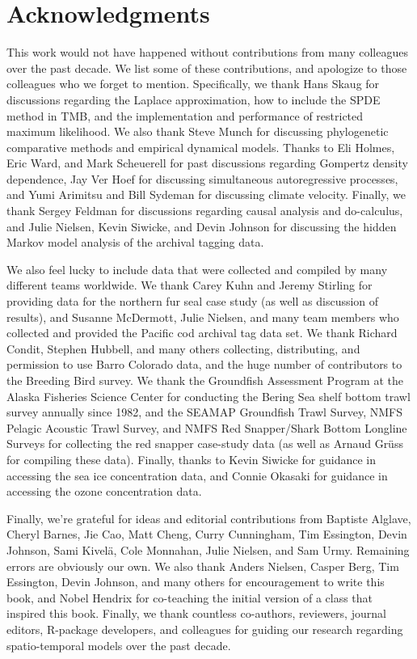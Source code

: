 
\chapter{Acknowledgments} 

This work would not have happened without contributions from many colleagues over the past decade.  We list some of these contributions, and apologize to those colleagues who we forget to mention.  Specifically, we thank Hans Skaug for discussions regarding the Laplace approximation, how to include the SPDE method in TMB, and the implementation and performance of restricted maximum likelihood. We also thank Steve Munch for discussing phylogenetic comparative methods and empirical dynamical models. Thanks to Eli Holmes, Eric Ward, and Mark Scheuerell for past discussions regarding Gompertz density dependence, Jay Ver Hoef for discussing simultaneous autoregressive processes, and Yumi Arimitsu and Bill Sydeman for discussing climate velocity.  Finally, we thank Sergey Feldman for discussions regarding causal analysis and do-calculus, and Julie Nielsen, Kevin Siwicke, and Devin Johnson for discussing the hidden Markov model analysis of the archival tagging data.  

We also feel lucky to include data that were collected and compiled by many different teams worldwide.  We thank Carey Kuhn and Jeremy Stirling for providing data for the northern fur seal case study (as well as discussion of results), and Susanne McDermott, Julie Nielsen, and many team members who collected and provided the Pacific cod archival tag data set.  We thank Richard Condit, Stephen Hubbell, and many others collecting, distributing, and permission to use Barro Colorado data, and the huge number of contributors to the Breeding Bird survey.  We thank the Groundfish Assessment Program at the Alaska Fisheries Science Center for conducting the Bering Sea shelf bottom trawl survey annually since 1982, and the SEAMAP Groundfish Trawl Survey, NMFS Pelagic Acoustic Trawl Survey, and NMFS Red Snapper/Shark Bottom Longline Surveys for collecting the red snapper case-study data (as well as Arnaud Grüss for compiling these data). Finally, thanks to Kevin Siwicke for guidance in accessing the sea ice concentration data, and Connie Okasaki for guidance in accessing the ozone concentration data.  

Finally, we're grateful for ideas and editorial contributions from Baptiste Alglave, Cheryl Barnes, Jie Cao, Matt Cheng, Curry Cunningham, Tim Essington, Devin Johnson, Sami Kivelä, Cole Monnahan, Julie Nielsen, and Sam Urmy.  Remaining errors are obviously our own.  We also thank Anders Nielsen, Casper Berg, Tim Essington, Devin Johnson, and many others for encouragement to write this book, and Nobel Hendrix for co-teaching the initial version of a class that inspired this book.  Finally, we thank countless co-authors, reviewers, journal editors, R-package developers, and colleagues for guiding our research regarding spatio-temporal models over the past decade. 
